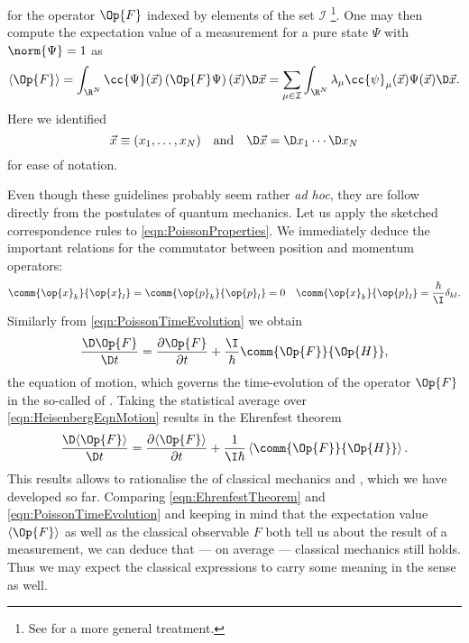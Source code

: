 \begin{enumerate}
		for the operator $\Op{F}$
		indexed by elements of the set $\mathcal{I}$%
		\footnote{See \cite{Helffer2013} for a more general treatment.}.
		One may then compute the expectation value of a measurement
		for a pure state $\Psi$ with $\norm{\Psi} = 1$ as
		\begin{equation}
			\langle \Op{F} \rangle = \int_{\R^N} \cc{\Psi}(\vec{x}) \left(\Op{F} \Psi\right)(\vec{x}) \D \vec{x} = \sum_{\mu\in\mathcal{I}} \int_{\R^N} \lambda_\mu \cc{\psi}_\mu(\vec{x}) \Psi(\vec{x}) \D \vec{x}.
			\label{eqn:QMExpectation}
		\end{equation}
		Here we identified
		\[ \vec{x} \equiv (x_1, \ldots, x_N) \quad \text{and} \quad \D \vec{x} = \D x_1 \cdots \D x_N \]
		for ease of notation.
\end{enumerate}
Even though these guidelines probably seem rather \textit{ad hoc},
they are follow directly from the postulates of quantum mechanics.
Let us apply the sketched correspondence rules to \eqref{eqn:PoissonProperties}.
We immediately deduce the important relations for the commutator
between position and momentum operators:
\begin{align}
	\comm{\op{x}_k}{\op{x}_l} &= \comm{\op{p}_k}{\op{p}_l} = 0 & \comm{\op{x}_k}{\op{p}_l} = \frac{\hbar}{\I} \delta_{kl}.
	\label{eqn:compatibilityOperator}
\end{align}
Similarly from \eqref{eqn:PoissonTimeEvolution} we obtain
\begin{equation}
	\frac{\D \Op{F}}{\D t} = \frac{\partial \Op{F}}{\partial t} + \frac{\I}{\hbar} \comm{\Op{F}}{\Op{H}},
	\label{eqn:HeisenbergEqnMotion}
\end{equation}
the equation of motion, which governs the time-evolution of the operator $\Op{F}$
in the so-called  of \QM.
Taking the statistical average over \eqref{eqn:HeisenbergEqnMotion}
results in the Ehrenfest theorem
\begin{equation}
	\frac{\D \langle \Op{F} \rangle}{\D t} = \frac{\partial \langle \Op{F} \rangle}{\partial t} + \frac{1}{\I \hbar} \left\langle \comm{\Op{F}}{\Op{H}} \right\rangle.
	\label{eqn:EhrenfestTheorem}
\end{equation}
This results allows to rationalise the 
of classical mechanics and \QM,
which we have developed so far.
Comparing \eqref{eqn:EhrenfestTheorem} and \eqref{eqn:PoissonTimeEvolution}
and keeping in mind that the expectation value $\langle \Op{F} \rangle$
as well as the classical observable $F$ both tell us about the result
of a measurement,
we can deduce that --- on average --- classical mechanics still holds.
Thus we may expect the classical expressions to carry some meaning
in the \QM sense as well.

